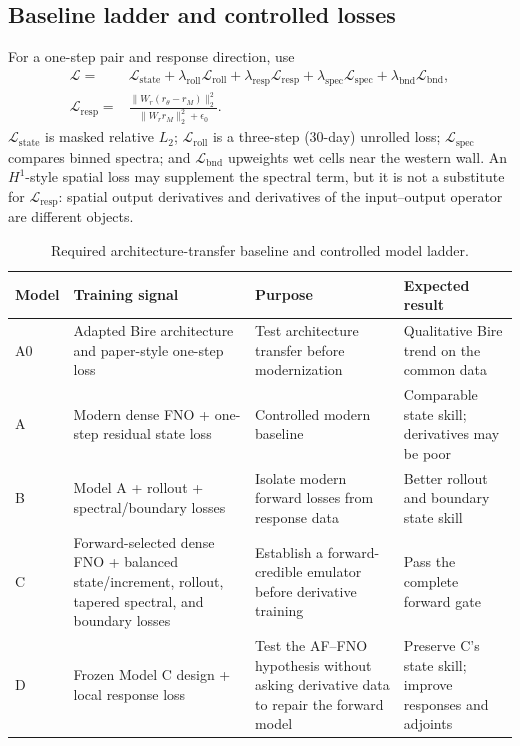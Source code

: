\documentclass[11pt]{article}
\newcommand{\AF}{AF--FNO}
\begin{document}
\subsection{Baseline ladder and controlled losses}
For a one-step pair and response direction, use
\begin{align}
\mathcal{L}={}&\mathcal{L}_{\mathrm{state}}
+\lambda_{\mathrm{roll}}\mathcal{L}_{\mathrm{roll}}
+\lambda_{\mathrm{resp}}\mathcal{L}_{\mathrm{resp}}
+\lambda_{\mathrm{spec}}\mathcal{L}_{\mathrm{spec}}
+\lambda_{\mathrm{bnd}}\mathcal{L}_{\mathrm{bnd}},\\
\mathcal{L}_{\mathrm{resp}}={}&
\frac{\lVert W_r(r_\theta-r_M)\rVert_2^2}
{\lVert W_r r_M\rVert_2^2+\epsilon_0}.
\end{align}
\(\mathcal{L}_{\mathrm{state}}\) is masked relative \(L_2\);
\(\mathcal{L}_{\mathrm{roll}}\) is a three-step (30-day) unrolled loss;
\(\mathcal{L}_{\mathrm{spec}}\) compares binned spectra; and
\(\mathcal{L}_{\mathrm{bnd}}\) upweights wet cells near the western wall. An
\(H^1\)-style spatial loss may supplement the spectral term, but it is not a substitute
for \(\mathcal{L}_{\mathrm{resp}}\): spatial output derivatives and derivatives of the
input--output operator are different objects.

\begin{table}[htbp]\centering\small
\caption{Required architecture-transfer baseline and controlled model ladder.}
\label{tab:ablations}
\begin{tabularx}{\textwidth}{@{}p{}p{}YY@{}}
\toprule
\textbf{Model} & \textbf{Training signal} & \textbf{Purpose} & \textbf{Expected result} \\
\midrule
A0 & Adapted Bire architecture and paper-style one-step loss & Test architecture transfer before modernization & Qualitative Bire trend on the common data \\
A & Modern dense FNO + one-step residual state loss & Controlled modern baseline & Comparable state skill; derivatives may be poor \\
B & Model A + rollout + spectral/boundary losses & Isolate modern forward losses from response data & Better rollout and boundary state skill \\
C & Forward-selected dense FNO + balanced state/increment, rollout, tapered spectral, and boundary losses & Establish a forward-credible emulator before derivative training & Pass the complete forward gate \\
D & Frozen Model C design + local response loss & Test the \AF{} hypothesis without asking derivative data to repair the forward model & Preserve C's state skill; improve responses and adjoints \\
\bottomrule
\end{tabularx}
\end{table}
\end{document}
